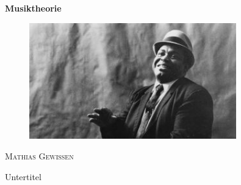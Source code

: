 \begin{titlepage}

    \vspace{20mm}

    \centering
    \huge\textbf{Musiktheorie}\par
    \vspace{3mm}

    \begin{figure}[htbp]
        \centering
        \includegraphics[width=0.8\textwidth]{images/title_img}
    \end{figure}

    \vspace{3mm}
    \textsc{\LARGE{Mathias Gewissen}}\par
    \vspace{3mm}
    \large Untertitel \par

\end{titlepage}
